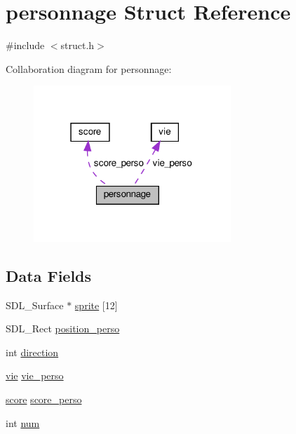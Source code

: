 \hypertarget{structpersonnage}{}\section{personnage Struct Reference}
\label{structpersonnage}


{\ttfamily \#include $<$struct.\+h$>$}



Collaboration diagram for personnage\+:
\nopagebreak
\begin{figure}[H]
\begin{center}
\leavevmode
\includegraphics[width=211pt]{structpersonnage__coll__graph}
\end{center}
\end{figure}
\subsection*{Data Fields}
\begin{DoxyCompactItemize}
\item 
S\+D\+L\+\_\+\+Surface $\ast$ \hyperlink{structpersonnage_a3fc8b5a6848cc4b09b844f482411a414}{sprite} \mbox{[}12\mbox{]}
\item 
S\+D\+L\+\_\+\+Rect \hyperlink{structpersonnage_a4a45c9e4310d819fcd3c9a60fc8c0ebf}{position\+\_\+perso}
\item 
int \hyperlink{structpersonnage_a2664acffa6fccd8487b9e03b63fbd6da}{direction}
\item 
\hyperlink{structvie}{vie} \hyperlink{structpersonnage_ac96f4aee44111bc31a7718e5762bf483}{vie\+\_\+perso}
\item 
\hyperlink{structscore}{score} \hyperlink{structpersonnage_a7ea99b7d0c8445cb3d7ba6717eb89d8c}{score\+\_\+perso}
\item 
int \hyperlink{structpersonnage_acfac32928075716cc10265cfc9f551fc}{num}
\end{DoxyCompactItemize}


